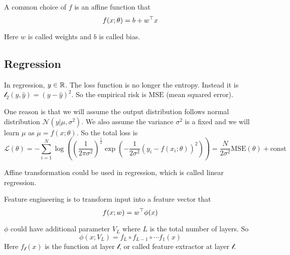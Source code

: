 \begin{example}
    A common choice of $f$ is an affine function that
\begin{equation}
    f(x;\theta) = b + {w}^\top x
\end{equation}

Here $w$ is called weights and $b$ is called bias.
\end{example}


\subsection{Regression}

In regression, $y \in \mathbb{R}$. The loss function is no longer the entropy. Instead it is $\mathcal{l}_2 (y, \hat{y}) = (y - \hat{y})^2$. So the empirical risk is $\mathrm{MSE}$ (mean squared error).

\begin{theorem}
    One reason is that we will assume the output distribution follows normal distribution $\mathcal{N}(y|\mu,\sigma^2)$. We also assume the variance $\sigma^2$ is a fixed and we will learn $\mu$ as $\mu = f(x;\theta)$. So the total loss is
\begin{equation}
    \mathcal{L}(\theta) = - \sum_{i=1}^N \log \left( \left(\frac{1}{2\pi \sigma^2}\right)^{\frac{1}{2}} \exp\left(- \frac{1}{2 \sigma^2} \left( y_i - f(x_i ; \theta) \right)^2 \right) \right) = \frac{N}{2\sigma^2} \mathrm{MSE}(\theta) + \mathrm{const}
\end{equation}
\end{theorem}




Affine transformation could be used in regression, which is called linear regression.

\begin{definition}
    Feature engineering is to transform input into a feature vector that 
    \begin{equation}
        f(x;w) = {w}^\top \phi(x)
    \end{equation}
\end{definition}

\begin{definition}
    $\phi$ could have additional parameter $V_L$ where $L$ is the total number of layers. So
    \begin{equation}
        \phi(x;V_L) = f_L \circ f_{L-1} \circ \cdots f_1 (x)
    \end{equation}
    Here $f_{\mathcal{l}}(x)$ is the function at layer $\mathcal{l}$, or called feature extractor at layer $\mathcal{l}$.
\end{definition}


